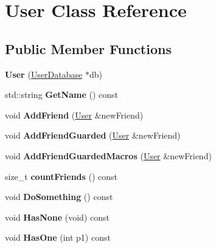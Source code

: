 \hypertarget{classUser}{}\section{User Class Reference}
\label{classUser}
\subsection*{Public Member Functions}
\begin{DoxyCompactItemize}
\item 
\hypertarget{classUser_ac4b8c464c176ab4193acbb7e4826943d}{}{\bfseries User} (\hyperlink{structUserDatabase}{User\+Database} $\ast$db)\label{classUser_ac4b8c464c176ab4193acbb7e4826943d}

\item 
\hypertarget{classUser_a11573aed9ad3a1adfd9687cfe2e05b0b}{}std\+::string {\bfseries Get\+Name} () const \label{classUser_a11573aed9ad3a1adfd9687cfe2e05b0b}

\item 
\hypertarget{classUser_aaf3c0f4eeb3da1ce325dbbb115f4487b}{}void {\bfseries Add\+Friend} (\hyperlink{classUser}{User} \&new\+Friend)\label{classUser_aaf3c0f4eeb3da1ce325dbbb115f4487b}

\item 
\hypertarget{classUser_a0fdb50727d0469abff1e44190f2f4fac}{}void {\bfseries Add\+Friend\+Guarded} (\hyperlink{classUser}{User} \&new\+Friend)\label{classUser_a0fdb50727d0469abff1e44190f2f4fac}

\item 
\hypertarget{classUser_a467cea2654f38f5909c45661f5cea2d8}{}void {\bfseries Add\+Friend\+Guarded\+Macros} (\hyperlink{classUser}{User} \&new\+Friend)\label{classUser_a467cea2654f38f5909c45661f5cea2d8}

\item 
\hypertarget{classUser_a3cf3354b057754f6b3065874b4fbc5f2}{}size\+\_\+t {\bfseries count\+Friends} () const \label{classUser_a3cf3354b057754f6b3065874b4fbc5f2}

\item 
\hypertarget{classUser_a149ce5e7bc7910d6655cd6ef0ffc4e9f}{}void {\bfseries Do\+Something} () const \label{classUser_a149ce5e7bc7910d6655cd6ef0ffc4e9f}

\item 
\hypertarget{classUser_a4a39a861b081387860000c27c1b799df}{}void {\bfseries Has\+None} (void) const \label{classUser_a4a39a861b081387860000c27c1b799df}

\item 
\hypertarget{classUser_af2394a2e9deb9a967cb650895a0d8510}{}void {\bfseries Has\+One} (int p1) const \label{classUser_af2394a2e9deb9a967cb650895a0d8510}


\end{DoxyCompactItemize}
